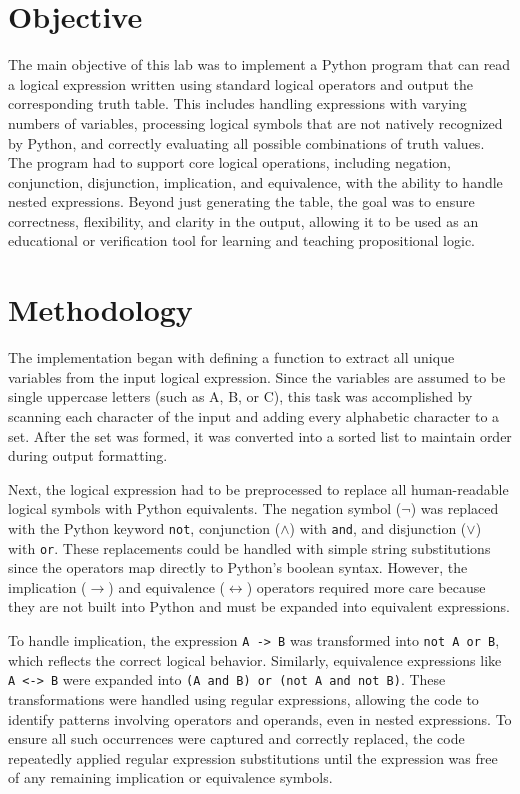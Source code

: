\documentclass[a4paper, journal]{IEEEtran}
\begin{document}
\section{Objective}
The main objective of this lab was to implement a Python program that can read a logical expression written using standard logical operators and output the corresponding truth table. This includes handling expressions with varying numbers of variables, processing logical symbols that are not natively recognized by Python, and correctly evaluating all possible combinations of truth values. The program had to support core logical operations, including negation, conjunction, disjunction, implication, and equivalence, with the ability to handle nested expressions. Beyond just generating the table, the goal was to ensure correctness, flexibility, and clarity in the output, allowing it to be used as an educational or verification tool for learning and teaching propositional logic.

\section{Methodology}
The implementation began with defining a function to extract all unique variables from the input logical expression. Since the variables are assumed to be single uppercase letters (such as A, B, or C), this task was accomplished by scanning each character of the input and adding every alphabetic character to a set. After the set was formed, it was converted into a sorted list to maintain order during output formatting.

Next, the logical expression had to be preprocessed to replace all human-readable logical symbols with Python equivalents. The negation symbol (\(\lnot\)) was replaced with the Python keyword \texttt{not}, conjunction (\(\land\)) with \texttt{and}, and disjunction (\(\lor\)) with \texttt{or}. These replacements could be handled with simple string substitutions since the operators map directly to Python's boolean syntax. However, the implication (\(\rightarrow\)) and equivalence (\(\leftrightarrow\)) operators required more care because they are not built into Python and must be expanded into equivalent expressions.

To handle implication, the expression \texttt{A -> B} was transformed into \texttt{not A or B}, which reflects the correct logical behavior. Similarly, equivalence expressions like \texttt{A <-> B} were expanded into \texttt{(A and B) or (not A and not B)}. These transformations were handled using regular expressions, allowing the code to identify patterns involving operators and operands, even in nested expressions. To ensure all such occurrences were captured and correctly replaced, the code repeatedly applied regular expression substitutions until the expression was free of any remaining implication or equivalence symbols.
\end{document}
